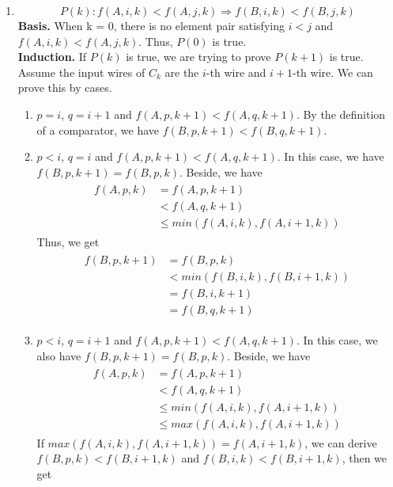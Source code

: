 \documentclass[12pt,a4paper]{article}
\makeatletter
\newtheorem*{solution}{Solution}
\theoremstyle{definition}
\renewenvironment{solution}[1][Solution] {\par\pushQED{\qed}\normalfont\topsep6\p@\@plus6\p@\relax\trivlist\item[\hskip\labelsep\bfseries#1\@addpunct{.}]\ignorespaces}{\popQED\endtrivlist\@endpefalse} \makeatother
\makeatother
\begin{document}
\begin{enumerate}
\begin{solution}
\begin{enumerate}
\begin{equation}
        P(k):f(A,i,k)<f(A,j,k) \Rightarrow f(B,i,k)<f(B,j,k)
    \end{equation}
    \textbf{Basis.} When k = 0, there is no element pair satisfying $i<j$ and $f(A,i,k)<f(A,j,k)$. Thus, $P(0)$ is true.\\
    \textbf{Induction.} If $P(k)$ is true, we are trying to prove $P(k+1)$ is true. Assume the input wires of $C_k$ are the $i$-th wire and $i+1$-th wire. We can prove this by cases.
    \begin{enumerate}
        \item $p=i$, $q = i+1$ and $f(A,p,k+1)<f(A,q,k+1)$. By the definition of a comparator, we have $f(B,p,k+1)<f(B,q,k+1)$.
        \item $p<i$, $q = i$ and $f(A,p,k+1)<f(A,q,k+1)$. In this case, we have $f(B,p,k+1)=f(B,p,k)$. Beside, we have
        \begin{align}
        \begin{split}
            f(A,p,k) &= f(A,p,k+1)\\
            &<f(A,q,k+1)\\
            &\leq min(f(A,i,k),f(A,i+1,k))
        \end{split}
        \end{align}
        Thus, we get
        \begin{align}
        \begin{split}
            f(B,p,k+1)&=f(B,p,k)\\
            &<min(f(B,i,k),f(B,i+1,k))\\ 
            &= f(B,i,k+1)\\ 
            &= f(B,q,k+1)
        \end{split}
        \end{align}
        \item $p<i$, $q = i+1$ and $f(A,p,k+1)<f(A,q,k+1)$. In this case, we also have $f(B,p,k+1) = f(B,p,k)$. Beside, we have
        \begin{align}
        \begin{split}
            f(A,p,k) &= f(A,p,k+1)\\
            &<f(A,q,k+1)\\
            &\leq min(f(A,i,k),f(A,i+1,k))\\
            &\leq max(f(A,i,k),f(A,i+1,k))
        \end{split}
        \end{align}
        If $max(f(A,i,k),f(A,i+1,k)) = f(A,i+1,k)$, we can derive $f(B,p,k)<f(B,i+1,k)$ and $f(B,i,k)<f(B,i+1,k)$, then we get

\end{enumerate}
\end{enumerate}
\end{solution}
\end{enumerate}
\end{document}
